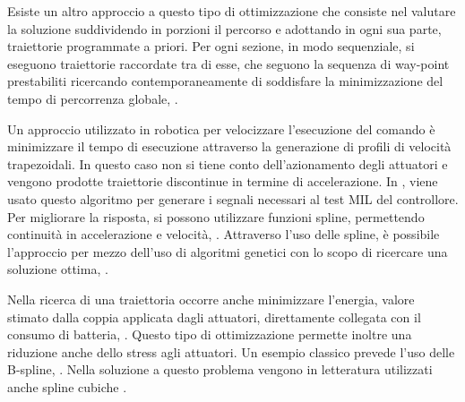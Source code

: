 Esiste un altro approccio a questo tipo di ottimizzazione che consiste nel valutare la soluzione suddividendo in porzioni il percorso e adottando in ogni sua parte, traiettorie programmate a priori. Per ogni sezione, in modo sequenziale, si eseguono traiettorie raccordate tra di esse, che seguono la sequenza di way-point prestabiliti ricercando contemporaneamente di soddisfare la minimizzazione del tempo di percorrenza globale, \cite{HowieChoset2005PoRM}. 

Un approccio utilizzato in robotica per velocizzare l'esecuzione del comando è minimizzare il tempo di esecuzione attraverso la generazione di profili di velocità trapezoidali. In questo caso non si tiene conto dell'azionamento degli attuatori e vengono prodotte traiettorie discontinue in termine di accelerazione. In \cite{DesTestCarm}, viene usato questo algoritmo per generare i segnali necessari al test MIL del controllore.
Per migliorare la risposta, si possono utilizzare funzioni spline, permettendo continuità in accelerazione e velocità, \cite{baseTesi}.
Attraverso l'uso delle spline, è possibile l'approccio per mezzo dell'uso di algoritmi genetici con lo scopo di ricercare una soluzione ottima, \cite{PathPlannigOverview}.

Nella ricerca di una traiettoria occorre anche minimizzare l'energia, valore stimato dalla coppia applicata dagli attuatori, direttamente collegata con il consumo di batteria, \cite{PathPlannigOverview}. Questo tipo di ottimizzazione permette inoltre una riduzione anche dello stress agli attuatori. Un esempio classico prevede l'uso delle B-spline, \cite{MartinBryanJ1999MMfO}. Nella soluzione a questo problema vengono in letteratura utilizzati anche spline cubiche \cite{Shin1986ADP}.
